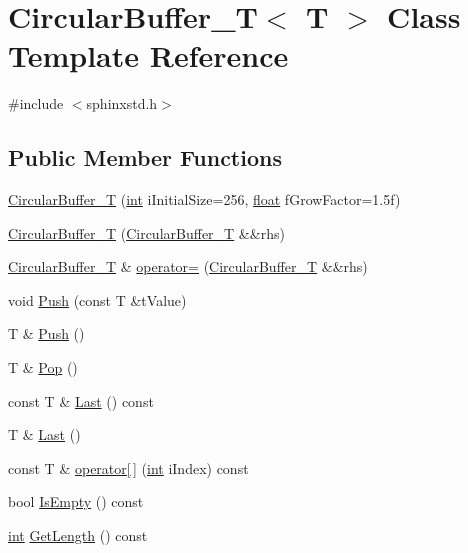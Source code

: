 \hypertarget{classCircularBuffer__T}{\section{Circular\-Buffer\-\_\-\-T$<$ T $>$ Class Template Reference}
\label{classCircularBuffer__T}
}


{\ttfamily \#include $<$sphinxstd.\-h$>$}

\subsection*{Public Member Functions}
\begin{DoxyCompactItemize}
\item 
\hyperlink{classCircularBuffer__T_a618a605388c29adeead2d4975d0db306}{Circular\-Buffer\-\_\-\-T} (\hyperlink{sphinxexpr_8cpp_a4a26e8f9cb8b736e0c4cbf4d16de985e}{int} i\-Initial\-Size=256, \hyperlink{sphinxexpr_8cpp_a0e0d0739f7035f18f949c2db2c6759ec}{float} f\-Grow\-Factor=1.\-5f)
\item 
\hyperlink{classCircularBuffer__T_a97b9093813a582b008a8f98067b5280a}{Circular\-Buffer\-\_\-\-T} (\hyperlink{classCircularBuffer__T}{Circular\-Buffer\-\_\-\-T} \&\&rhs)
\item 
\hyperlink{classCircularBuffer__T}{Circular\-Buffer\-\_\-\-T} \& \hyperlink{classCircularBuffer__T_a0a4665383249defdb4400ed2bf52d0cb}{operator=} (\hyperlink{classCircularBuffer__T}{Circular\-Buffer\-\_\-\-T} \&\&rhs)
\item 
void \hyperlink{classCircularBuffer__T_a3b8781c93e6b0785a4751a5c0937a793}{Push} (const T \&t\-Value)
\item 
T \& \hyperlink{classCircularBuffer__T_add6f2e83e09e533703f4bb4acf380031}{Push} ()
\item 
T \& \hyperlink{classCircularBuffer__T_a8acaed573ae8fe8c7d17f43c9a8a7af6}{Pop} ()
\item 
const T \& \hyperlink{classCircularBuffer__T_a5b76fb221739631239df2e43fb0fb50d}{Last} () const 
\item 
T \& \hyperlink{classCircularBuffer__T_a9669cbc608ef3b19e72eb18911fb6d27}{Last} ()
\item 
const T \& \hyperlink{classCircularBuffer__T_a42e0fe9209ac1471eeed66286007fc06}{operator\mbox{[}$\,$\mbox{]}} (\hyperlink{sphinxexpr_8cpp_a4a26e8f9cb8b736e0c4cbf4d16de985e}{int} i\-Index) const 
\item 
bool \hyperlink{classCircularBuffer__T_a4cf2e38d7d28b27c6a83bec1c3f12150}{Is\-Empty} () const 
\item 
\hyperlink{sphinxexpr_8cpp_a4a26e8f9cb8b736e0c4cbf4d16de985e}{int} \hyperlink{classCircularBuffer__T_a6fde8d3a8bc07b0f7fb0e8e2370796a4}{Get\-Length} () const 
\end{DoxyCompactItemize}
